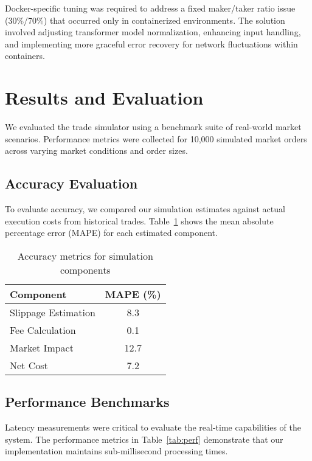 \documentclass[10pt,twocolumn,a4paper]{IEEEtran}
\begin{document}
Docker-specific tuning was required to address a fixed maker/taker ratio issue (30\%/70\%) that occurred only in containerized environments. The solution involved adjusting transformer model normalization, enhancing input handling, and implementing more graceful error recovery for network fluctuations within containers.

\section{Results and Evaluation}

We evaluated the trade simulator using a benchmark suite of real-world market scenarios. Performance metrics were collected for 10,000 simulated market orders across varying market conditions and order sizes.

\subsection{Accuracy Evaluation}

To evaluate accuracy, we compared our simulation estimates against actual execution costs from historical trades. Table~\ref{tab:accuracy} shows the mean absolute percentage error (MAPE) for each estimated component.

\begin{table}[t]
\centering
\begin{tabular}{@{}lc@{}}
\toprule
\textbf{Component} & \textbf{MAPE (\%)} \\ \midrule
Slippage Estimation & 8.3 \\
Fee Calculation & 0.1 \\
Market Impact & 12.7 \\
Net Cost & 7.2 \\ \bottomrule
\end{tabular}
\caption{Accuracy metrics for simulation components}
\label{tab:accuracy}
\end{table}

\subsection{Performance Benchmarks}

Latency measurements were critical to evaluate the real-time capabilities of the system. The performance metrics in Table~\ref{tab:perf} demonstrate that our implementation maintains sub-millisecond processing times.
\end{document}
